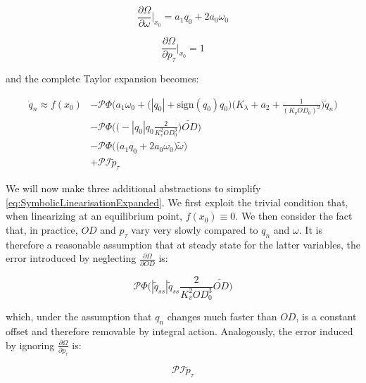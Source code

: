 \begin{equation}\label{eq:PartialTaylorOmega}
	\frac{\partial \Omega}{\partial \omega}\bigg\rvert_{x_0} 
	=
	a_1 q_0 + 2a_0\omega_0
\end{equation}

\begin{equation}\label{eq:PartialTaylorPressure}
		\frac{\partial \Omega}{\partial p_\tau}\bigg\rvert_{x_0} 
	=
	1
\end{equation}

and the complete Taylor expansion becomes:

\begin{equation}\label{eq:SymbolicLinearisationExpanded}
	\begin{split}
			\dot{q}_n \approx f(x_0) &-\mathcal{P}\Phi\Bigg(a_1\omega_0 + \Big(|q_0|+\text{sign}(q_0)q_0\Big)\Bigg(K_\lambda + a_2 + \frac{1}{(K_v OD_0)^2}\Bigg) \tilde{q}_n \Bigg)  \\
			&- \mathcal{P}\Phi\Bigg(\Big(-|q_0|q_0 \frac{2}{K_v^2 OD_0^3}\Big) \tilde{OD}\Bigg) \\
			&-  \mathcal{P}\Phi\Bigg(\Big(a_1 q_0 + 2a_0\omega_0\Big) \tilde{\omega}\Bigg) \\
			&+ \mathcal{P} \mathcal{I} \tilde{p}_\tau
	\end{split}
\end{equation}

We will now make three additional abstractions to simplify \cref{eq:SymbolicLinearisationExpanded}. We first exploit the trivial condition that, when linearizing at an equilibrium point, $f(x_0) \equiv 0$. We then consider the fact that, in practice, $OD$ and $p_\tau$ vary very slowly compared to $q_n$ and $\omega$. It is therefore a reasonable assumption that at steady state for the latter variables, the error introduced by neglecting $\frac{\partial\Omega}{\partial OD}$ is:

\begin{equation}\label{eq:IgnoreODError}
	\mathcal{P}\Phi\Big(|\tilde{q}_{ss}|\tilde{q}_{ss}\frac{2}{K_v^2 OD_0^3} \tilde{OD}\Big)
\end{equation}

which, under the assumption that $q_n$ changes much faster than $OD$, is a constant offset and therefore removable by integral action. Analogously, the error induced by ignoring $\frac{\partial\Omega}{\partial p_\tau}$ is: 

\begin{equation}\label{eq:IgnorePressureError}
	\mathcal{P}\mathcal{I}\tilde{p}_\tau
\end{equation}

